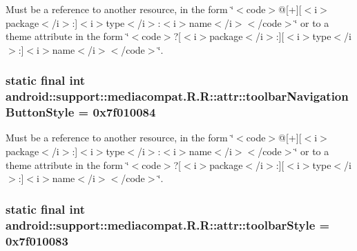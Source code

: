 Must be a reference to another resource, in the form \char`\"{}$<$code$>$@\mbox{[}+\mbox{]}\mbox{[}$<$i$>$package$<$/i$>$:\mbox{]}$<$i$>$type$<$/i$>$:$<$i$>$name$<$/i$>$$<$/code$>$\char`\"{} or to a theme attribute in the form \char`\"{}$<$code$>$?\mbox{[}$<$i$>$package$<$/i$>$:\mbox{]}\mbox{[}$<$i$>$type$<$/i$>$:\mbox{]}$<$i$>$name$<$/i$>$$<$/code$>$\char`\"{}. \hypertarget{classandroid_1_1support_1_1mediacompat_1_1_r_1_1attr_c6681818888f00dff27c98c768b77948}{
\subsubsection[{toolbarNavigationButtonStyle}]{\setlength{\rightskip}{0pt plus 5cm}static final int android::support::mediacompat.R.R::attr::toolbarNavigationButtonStyle = 0x7f010084}}
\label{classandroid_1_1support_1_1mediacompat_1_1_r_1_1attr_c6681818888f00dff27c98c768b77948}


Must be a reference to another resource, in the form \char`\"{}$<$code$>$@\mbox{[}+\mbox{]}\mbox{[}$<$i$>$package$<$/i$>$:\mbox{]}$<$i$>$type$<$/i$>$:$<$i$>$name$<$/i$>$$<$/code$>$\char`\"{} or to a theme attribute in the form \char`\"{}$<$code$>$?\mbox{[}$<$i$>$package$<$/i$>$:\mbox{]}\mbox{[}$<$i$>$type$<$/i$>$:\mbox{]}$<$i$>$name$<$/i$>$$<$/code$>$\char`\"{}. \hypertarget{classandroid_1_1support_1_1mediacompat_1_1_r_1_1attr_d1ea6dd10891f4ce1d1eac7222560043}{
\subsubsection[{toolbarStyle}]{\setlength{\rightskip}{0pt plus 5cm}static final int android::support::mediacompat.R.R::attr::toolbarStyle = 0x7f010083}}
\label{classandroid_1_1support_1_1mediacompat_1_1_r_1_1attr_d1ea6dd10891f4ce1d1eac7222560043}


